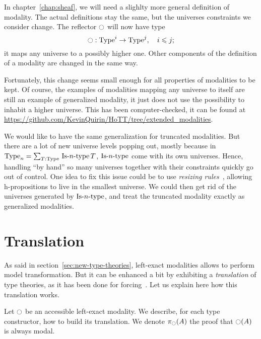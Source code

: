 In chapter~\ref{chap:sheaf}, we will need a slighlty more general
definition of modality. The actual definitions stay the same, but the
universes constraints we consider change. The reflector $\ocircle$ will
now have type
\[ \ocircle : \operatorname{Type}^i \to \operatorname{Type}^j,\quad i \leqslant j ;\]
it maps any universe to a possibly higher one.
Other components of the definition of a modality are changed in the
same way. 

Fortunately, this change seems small enough for all properties of
modalities to be kept. Of course, the examples of modalities mapping
any universe to itself are still an example of generalized modality,
it just does not use the possibility to inhabit a higher
universe. This has been computer-checked, it can be found at 
\url{https://github.com/KevinQuirin/HoTT/tree/extended_modalities}.

We would like to have the same generalization for truncated
modalities. But there are a lot of new universe levels popping out,
mostly because in $\operatorname{Type}_n = \sum_{T:\operatorname{Type}}\, \mathop{\mathrm{Is{\hbox{-}}}n\mathrm{{\hbox{-}} type}} T$, $\mathop{\mathrm{Is{\hbox{-}}}n\mathrm{{\hbox{-}} type}}$
come with its own universes. Hence, handling ``by hand'' so many
universes together with their constraints quickly go out of
control. One idea to fix this issue could be to use {\em resizing
  rules}~\cite{vv-resizing}, allowing h-propositions to live in the
smallest universe. We could then get rid of the universes generated by
$\mathop{\mathrm{Is{\hbox{-}}}n\mathrm{{\hbox{-}} type}}$, and treat the truncated modality exactly as generalized
modalities.







\section{Translation}
\label{sec:translation}

As said in section~\ref{sec:new-type-theories}, left-exact modalities
allows to perform model transformation. But it can be enhanced a bit
by exhibiting a {\em translation} of type theories, as it has been done for
forcing~\cite{jaber2012extending}. Let us explain
here how this translation works.

Let $\ocircle$ be an accessible left-exact modality. We describe, for each type
constructor, how to build its translation. We denote $\pi_{\ocircle}(A)$
the proof that $\ocircle(A)$ is always modal.

